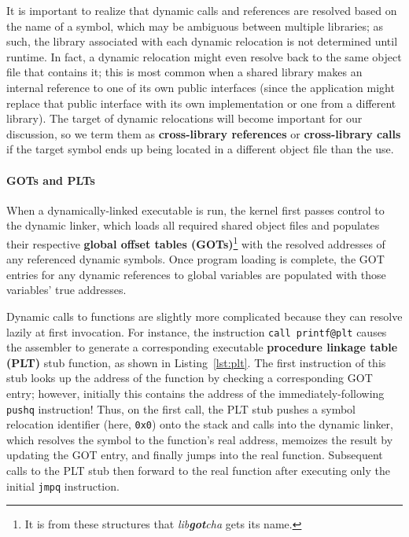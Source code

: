 It is important to realize that dynamic calls and references are resolved based on
the name of a symbol, which may be ambiguous between multiple libraries; as such, the
library associated with each dynamic relocation is not determined until runtime.
In fact, a dynamic relocation might even resolve back to the same object file that
contains it; this is most common when a shared library makes an internal reference to
one of its own public interfaces (since the application might replace that public
interface with its own implementation or one from a different library).  The target
of dynamic relocations will become important for our discussion, so we term them as
\textbf{cross-library references} or \textbf{cross-library calls} if the target
symbol ends up being located in a different object file than the use.

\paragraph{GOTs and PLTs}

When a dynamically-linked executable is run, the kernel first passes control to the
dynamic linker, which loads all required shared object files and populates their
respective \textbf{global offset tables (GOTs)}\footnote{It is from these structures
that \textit{lib\textbf{got}cha} gets its name.} with the resolved addresses of any
referenced dynamic symbols.  Once program loading is complete, the GOT entries
for any dynamic references to global variables are populated with those variables'
true addresses.

Dynamic calls to functions are slightly more complicated because they can resolve
lazily at first invocation.  For instance, the instruction
\texttt{call~printf@plt} causes the assembler to generate a corresponding executable
\textbf{procedure linkage table (PLT)} stub function, as shown in
Listing~\ref{lst:plt}.  The first instruction of this stub looks up the address of
the
function by checking a corresponding GOT entry; however, initially this contains the
address of the immediately-following \texttt{pushq} instruction!  Thus, on the first
call, the PLT stub pushes a symbol relocation identifier (here, \texttt{0x0}) onto
the stack and calls into the dynamic linker, which resolves the symbol to the
function's real address, memoizes the result by updating the GOT entry, and finally
jumps into the real function.  Subsequent calls to the PLT stub then forward to the
real function after executing only the initial \texttt{jmpq} instruction.

